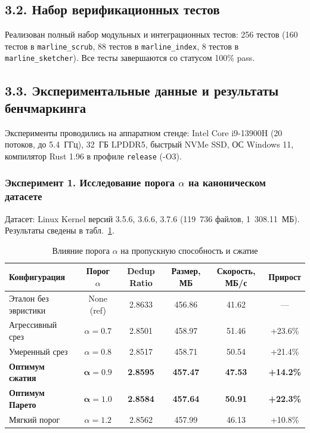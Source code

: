 \documentclass[a4paper,14pt]{extarticle}
\begin{document}
\subsection*{3.2. Набор верификационных тестов}
Реализован полный набор модульных и интеграционных тестов: 256 тестов (160 тестов в \texttt{marline\_scrub}, 88 тестов в \texttt{marline\_index}, 8 тестов в \texttt{marline\_sketcher}). Все тесты завершаются со статусом 100\% pass.

\subsection*{3.3. Экспериментальные данные и результаты бенчмаркинга}

Эксперименты проводились на аппаратном стенде: Intel Core i9-13900H (20 потоков, до 5.4~ГГц), 32~ГБ LPDDR5, быстрый NVMe SSD, ОС Windows 11, компилятор Rust 1.96 в профиле \texttt{release} (-O3).

\subsubsection*{Эксперимент 1. Исследование порога $\alpha$ на каноническом датасете}
Датасет: Linux Kernel версий 3.5.6, 3.6.6, 3.7.6 (119~736 файлов, 1~308.11~МБ). Результаты сведены в табл.~\ref{tab:alpha}.

\begin{table}[h!]
\small
\centering
\caption{Влияние порога $\alpha$ на пропускную способность и сжатие}
\label{tab:alpha}
\begin{tabularx}{\textwidth}{lccccc}
\toprule
\textbf{Конфигурация} & \textbf{Порог $\alpha$} & \textbf{Dedup Ratio} & \textbf{Размер, МБ} & \textbf{Скорость, МБ/с} & \textbf{Прирост} \\
\midrule
Эталон без эвристики & None (ref) & 2.8633 & 456.86 & 41.62 & — \\
Агрессивный срез & $\alpha = 0.7$ & 2.8501 & 458.97 & 51.46 & +23.6\% \\
Умеренный срез & $\alpha = 0.8$ & 2.8517 & 458.71 & 50.54 & +21.4\% \\
\textbf{Оптимум сжатия} & $\mathbf{\alpha = 0.9}$ & \textbf{2.8595} & \textbf{457.47} & \textbf{47.53} & \textbf{+14.2\%} \\
\textbf{Оптимум Парето} & $\mathbf{\alpha = 1.0}$ & \textbf{2.8584} & \textbf{457.64} & \textbf{50.91} & \textbf{+22.3\%} \\
Мягкий порог & $\alpha = 1.2$ & 2.8562 & 457.99 & 46.13 & +10.8\% \\
\bottomrule
\end{tabularx}
\end{table}
\end{document}
